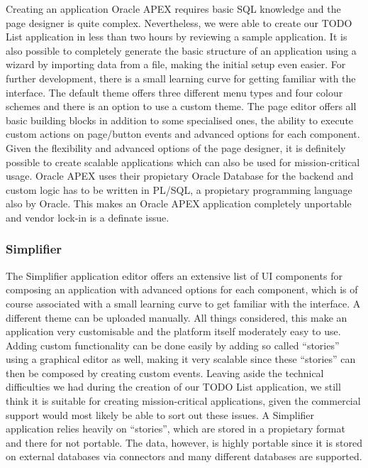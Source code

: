 \documentclass[runningheads]{llncs}
\begin{document}
Creating an application Oracle APEX requires basic SQL knowledge and the page designer is quite complex. Nevertheless, we were able to create our TODO List application in less than two hours by reviewing a sample application. It is also possible to completely generate the basic structure of an application using a wizard by importing data from a file, making the initial setup even easier. For further development, there is a small learning curve for getting familiar with the interface. The default theme offers three different menu types and four colour schemes and there is an option to use a custom theme. The page editor offers all basic building blocks in addition to some specialised ones, the ability to execute custom actions on page/button events and advanced options for each component. Given the flexibility and advanced options of the page designer, it is definitely possible to create scalable applications which can also be used for mission-critical usage. Oracle APEX uses their propietary Oracle Database for the backend and custom logic has to be written in PL/SQL, a propietary programming language also by Oracle. This makes an Oracle APEX application completely unportable and vendor lock-in is a definate issue.

\subsubsection{Simplifier}

The Simplifier application editor offers an extensive list of UI components for composing an application with advanced options for each component, which is of course associated with a small learning curve to get familiar with the interface. A different theme can be uploaded manually. All things considered, this make an application very customisable and the platform itself moderately easy to use. Adding custom functionality can be done easily by adding so called “stories” using a graphical editor as well, making it very scalable since these “stories” can then be composed by creating custom events. Leaving aside the technical difficulties we had during the creation of our TODO List application, we still think it is suitable for creating mission-critical applications, given the commercial support would most likely be able to sort out these issues. A Simplifier application relies heavily on “stories”, which are stored in a propietary format and there for not portable. The data, however, is highly portable since it is stored on external databases via connectors and many different databases are supported.
\end{document}
